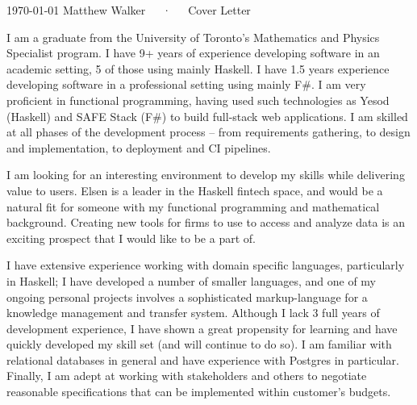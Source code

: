 \documentclass[11pt, a4paper]{awesome-cv}
\begin{document}
\makecvheader[R]

\makecvfooter
  {\today}
  {Matthew Walker~~~·~~~Cover Letter}
  {}

\makelettertitle

\begin{cvletter}


  I am a graduate from the University of Toronto's Mathematics and Physics
  Specialist program. I have 9+ years of experience developing software in an
  academic setting, 5 of those using mainly Haskell. I have 1.5 years experience
  developing software in a professional setting using mainly F\#. I am very
  proficient in functional programming, having used such technologies as Yesod
  (Haskell) and SAFE Stack (F\#) to build full-stack web applications. I am
  skilled at all phases of the development process -- from requirements
  gathering, to design and implementation, to deployment and CI pipelines.


  I am looking for an interesting environment to develop my skills while
  delivering value to users. Elsen is a leader in the Haskell fintech space, and
  would be a natural fit for someone with my functional programming and
  mathematical background. Creating new tools for firms to use to access and
  analyze data is an exciting prospect that I would like to be a part of.
  

  I have extensive experience working with domain specific languages,
  particularly in Haskell; I have developed a number of smaller languages, and
  one of my ongoing personal projects involves a sophisticated markup-language
  for a knowledge management and transfer system. Although I lack 3 full years
  of development experience, I have shown a great propensity for learning and
  have quickly developed my skill set (and will continue to do so). I am
  familiar with relational databases in general and have experience with
  Postgres in particular. Finally, I am adept at working with stakeholders and
  others to negotiate reasonable specifications that can be implemented within
  customer's budgets.
  
\end{cvletter}


\makeletterclosing
\end{document}
